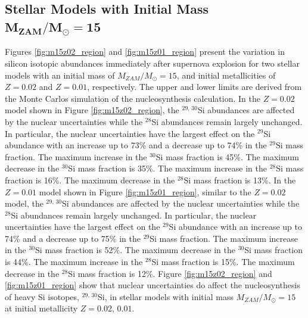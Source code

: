 \documentclass{brandeis-thesis3.2}
\def \msun {M_{\odot}}
\newcommand{\iso}[2]{$^{#1}${#2}}
\begin{document}
\subsection[Stellar Models with Initial Mass $M_{ZAM}/\msun = 15$]{Stellar Models with Initial Mass $\mathbf{M_{ZAM}/\msun = 15}$}
Figures \ref{fig:m15z02_region} and \ref{fig:m15z01_region} present the variation in silicon isotopic abundances immediately after supernova explosion for two stellar models with an initial mass of $M_{ZAM}/\msun =15$, and initial metallicities of $Z=0.02$ and $Z=0.01$, respectively. The upper and lower limits are derived from the Monte Carlos simulation of the nucleosynthesis calculation. In the $Z=0.02$ model shown in Figure \ref{fig:m15z02_region}, the \iso{29, \, 30}{Si} abundances are affected by the nuclear uncertainties while the \iso{28}{Si} abundances remain largely unchanged. In particular, the nuclear uncertainties have the largest effect on the \iso{29}{Si} abundance with an increase up to 73\% and a decrease up to 74\% in the \iso{29}{Si} mass fraction. The maximum increase in the \iso{30}{Si} mass fraction is 45\%. The maximum decrease in the \iso{30}{Si} mass fraction is 35\%. The maximum increase in the \iso{28}{Si} mass fraction is 16\%. The maximum decrease in the \iso{28}{Si} mass fraction is 13\%. In the $Z=0.01$ model shown in Figure \ref{fig:m15z01_region}, similar to the $Z=0.02$ model, the \iso{29, \, 30}{Si} abundances are affected by the nuclear uncertainties while the \iso{28}{Si} abundances remain largely unchanged. In particular, the nuclear uncertainties have the largest effect on the \iso{29}{Si} abundance with an increase up to 74\% and a decrease up to 75\% in the \iso{29}{Si} mass fraction. The maximum increase in the \iso{30}{Si} mass fraction is 52\%. The maximum decrease in the \iso{30}{Si} mass fraction is 44\%. The maximum increase in the \iso{28}{Si} mass fraction is 15\%. The maximum decrease in the \iso{28}{Si} mass fraction is 12\%. Figure \ref{fig:m15z02_region} and \ref{fig:m15z01_region} show that nuclear uncertainties do affect the nucleosynthesis of heavy Si isotopes, \iso{29,\, 30}{Si}, in stellar models with initial mass $M_{ZAM}/\msun =15$ at initial metallicity $Z=0.02,\, 0.01$.
\end{document}
